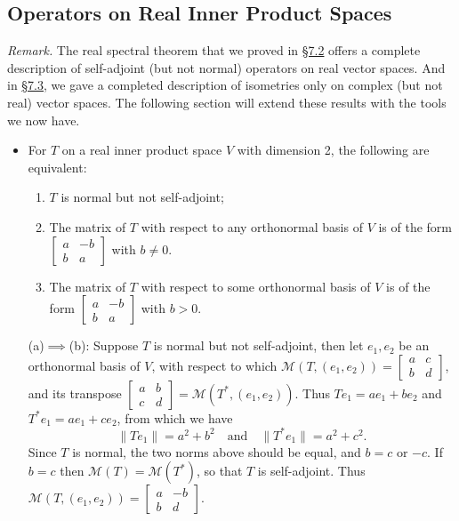 \documentclass[11pt]{article}
\newcommand{\lk}[2]{\hyperlink{subsection.#1.#2}{\S#1.#2}}
\newcommand{\nm}[1]{\lVert #1 \rVert}
\newcommand{\M}{\mathcal{M}}
\begin{document}
\subsection{Operators on Real Inner Product Spaces}
\textit{Remark.} The real spectral theorem that we proved in \lk{7}{2} offers a complete description of self-adjoint (but not normal) operators on real vector spaces. And in \lk{7}{3}, we gave a completed description of isometries only on complex (but not real) vector spaces. The following section will extend these results with the tools we now have.
\begin{itemize}
    \item For $T$ on a real inner product space $V$ with dimension 2, the following are equivalent:
    \begin{enumerate}[label=(\alph*)]
        \item $T$ is normal but not self-adjoint;
        \item The matrix of $T$ with respect to any orthonormal basis of $V$ is of the form $\begin{bmatrix}
            a & -b \\ b & a
        \end{bmatrix}$ with $b \neq 0$.
        \item The matrix of $T$ with respect to some orthonormal basis of $V$ is of the form $\begin{bmatrix}
            a & -b \\ b & a
        \end{bmatrix}$ with $b > 0$.
    \end{enumerate}
    
    (a)$\implies$(b): Suppose $T$ is normal but not self-adjoint, then let $e_1,e_2$ be an orthonormal basis of $V$, with respect to which $\M(T,(e_1,e_2)) = \begin{bmatrix}
        a & c \\ b & d
    \end{bmatrix}$, and its transpose $\begin{bmatrix}
        a & b \\ c & d
    \end{bmatrix} = \M(T^*,(e_1,e_2))$. Thus $Te_1 = a e_1 + b e_2$ and $T^*e_1 = ae_1 + ce_2$, from which we have \[\nm{Te_1} = a^2 + b^2 \quad \text{and} \quad \nm{T^*e_1} = a^2 + c^2.\] Since $T$ is normal, the two norms above should be equal, and $b = c$ or $-c$. If $b = c$ then $\M(T) = \M(T^*)$, so that $T$ is self-adjoint. Thus $\M(T,(e_1,e_2)) = \begin{bmatrix}
        a & -b \\ b & d
    \end{bmatrix}$.


\end{itemize}
\end{document}
